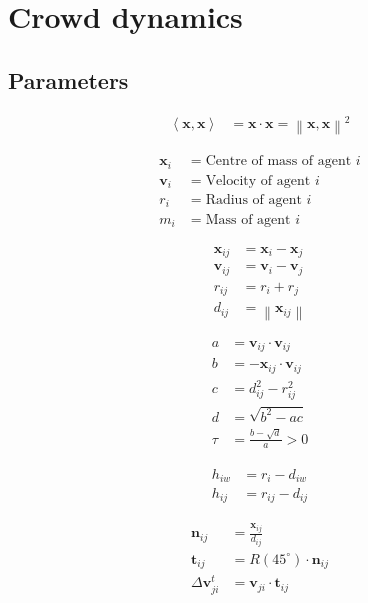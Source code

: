 \section{Crowd dynamics}
\subsection{Parameters}

\begin{align}
\left\langle \mathbf{x}, \mathbf{x} \right\rangle &= \mathbf{x} \cdot \mathbf{x} = \left\| \mathbf{x}, \mathbf{x} \right\|^{2}
\end{align}

\begin{align}
\mathbf{x}_{i} &= \text{Centre of mass of agent } i \\
\mathbf{v}_{i} &= \text{Velocity of agent } i \\
r_{i} &= \text{Radius of agent } i \\
m_{i} &= \text{Mass of agent } i
\end{align}

\begin{align}
\mathbf{x}_{ij} &= \mathbf{x}_{i} - \mathbf{x}_{j} \\
\mathbf{v}_{ij} &= \mathbf{v}_{i} - \mathbf{v}_{j} \\
r_{ij} &= r_{i} + r_{j} \\
d_{ij} &= \left\|\mathbf{x}_{ij}\right\|
\end{align}

\begin{align}
a &= \mathbf{v}_{ij} \cdot \mathbf{v}_{ij} \\
b &= -\mathbf{x}_{ij} \cdot \mathbf{v}_{ij} \\
c &= d_{ij}^{2} - r_{ij}^{2} \\
d &= \sqrt{b^{2} - a c} \\
\tau &= \frac{b - \sqrt{d}}{a} > 0
\end{align}

\begin{align}
h_{iw} &= r_{i} - d_{iw} \\
h_{ij} &= r_{ij} - d_{ij}
\end{align}

\begin{align}
\mathbf{n}_{ij} &= \frac{\mathbf{x}_{ij}}{d_{ij}} \\
\mathbf{t}_{ij} &= R(45^{\circ}) \cdot \mathbf{n}_{ij} \\
\Delta \mathbf{v}_{ji}^{t} &= \mathbf{v}_{ji} \cdot \mathbf{t}_{ij}
\end{align}

